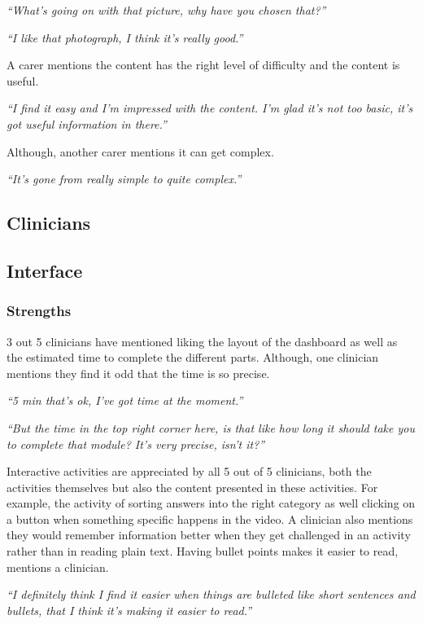 \documentclass{sigchi}
\begin{document}
\textit{“What’s going on with that picture, why have you chosen that?”}

\textit{“I like that photograph, I think it’s really good.”}

A carer mentions the content has the right level of difficulty and the content is useful. 

\textit{“I find it easy and I’m impressed with the content. I’m glad it’s not too basic, it’s got useful information in there.”}

Although, another carer mentions it can get complex.

\textit{“It’s gone from really simple to quite complex.”}

\subsection{Clinicians}

\subsection{Interface}

\subsubsection{Strengths}
3 out 5 clinicians have mentioned liking the layout of the dashboard as well as the estimated time to complete the different parts. Although, one clinician mentions they find it odd that the time is so precise.

\textit{“5 min that’s ok, I’ve got time at the moment.”}

\textit{“But the time in the top right corner here, is that like how long it should take you to complete that module? It’s very precise, isn’t it?”}

Interactive activities are appreciated by all 5 out of 5 clinicians, both the activities themselves but also the content presented in these activities. For example, the activity of sorting answers into the right category as well clicking on a button when something specific happens in the video. A clinician also mentions they would remember information better when they get challenged in an activity rather than in reading plain text. Having bullet points makes it easier to read, mentions a clinician.

\textit{“I definitely think I find it easier when things are bulleted like short sentences and bullets, that I think it’s making it easier to read.”}
\end{document}
